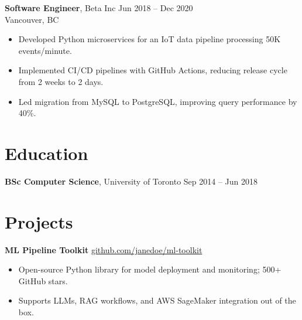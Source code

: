\documentclass[10pt, letterpaper]{article}
\begin{document}
\vspace{4pt}
\textbf{Software Engineer}, Beta Inc \hfill Jun 2018 -- Dec 2020\\
Vancouver, BC
\begin{itemize}[leftmargin=*]
    \item Developed Python microservices for an IoT data pipeline processing 50K events/minute.
    \item Implemented CI/CD pipelines with GitHub Actions, reducing release cycle from 2 weeks to 2 days.
    \item Led migration from MySQL to PostgreSQL, improving query performance by 40\%.
\end{itemize}

\section*{Education}
\textbf{BSc Computer Science}, University of Toronto \hfill Sep 2014 -- Jun 2018

\section*{Projects}

\textbf{ML Pipeline Toolkit} \hfill \href{https://github.com/janedoe/ml-toolkit}{github.com/janedoe/ml-toolkit}
\begin{itemize}[leftmargin=*]
    \item Open-source Python library for model deployment and monitoring; 500+ GitHub stars.
    \item Supports LLMs, RAG workflows, and AWS SageMaker integration out of the box.
\end{itemize}
\end{document}
